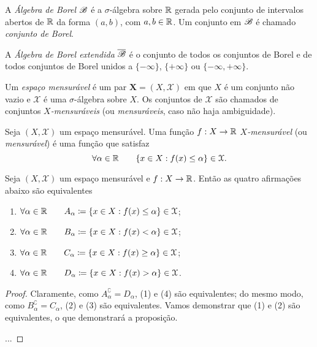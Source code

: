 \begin{defi}
	A \emph{Álgebra de Borel} $\mathscr B$ é a $\sigma$-álgebra sobre $\mathbb{R}$ gerada pelo conjunto de intervalos abertos de $\mathbb{R}$ da forma $(a,b)$, com $a,b \in \mathbb{R}$. Um conjunto em $\mathscr B$ é chamado \emph{conjunto de Borel}.
\end{defi}

\begin{defi}
	A \emph{Álgebra de Borel extendida} $\overline{\mathscr B}$ é o conjunto de todos os conjuntos de Borel e de todos conjuntos de Borel unidos a $\{-\infty\}$, $\{+\infty\}$ ou $\{-\infty,+\infty\}$.
\end{defi}

\begin{defi}
	Um \emph{espaço mensurável} é um par $\bm X = (X,\mathcal X)$ em que $X$ é um conjunto não vazio e $\mathcal X$ é uma $\sigma$-álgebra sobre $X$. Os conjuntos de $\mathcal X$ são chamados de conjuntos \emph{$X$-mensuráveis} (ou \emph{mensuráveis}, caso não haja ambiguidade).
\end{defi}

\begin{defi}
	Seja $(X,\mathcal X)$ um espaço mensurável. Uma função $f: X \to \mathbb{R}$ \emph{$X$-mensurável} (ou \emph{mensurável}) é uma função que satisfaz
	\begin{equation*}
	\forall \alpha \in \mathbb{R} \qquad \{x \in X : f(x) \leq \alpha\} \in \mathcal X.
	\end{equation*}
\end{defi}

\begin{prop}
	Seja $(X,\mathcal X)$ um espaço mensurável e $f: X \to \mathbb{R}$. Então as quatro afirmações abaixo são equivalentes
	\begin{enumerate}
	\item $\forall \alpha \in \mathbb{R} \qquad A_\alpha \coloneqq \{x \in X : f(x) \leq \alpha\} \in \mathcal X$;
	\item $\forall \alpha \in \mathbb{R} \qquad B_\alpha \coloneqq \{x \in X : f(x) < \alpha\} \in \mathcal X$;
	\item $\forall \alpha \in \mathbb{R} \qquad C_\alpha \coloneqq \{x \in X : f(x) \geq \alpha\} \in \mathcal X$;
	\item $\forall \alpha \in \mathbb{R} \qquad D_\alpha \coloneqq \{x \in X : f(x) > \alpha\} \in \mathcal X$.
	\end{enumerate}
\end{prop}
\begin{proof}
	Claramente, como $A_\alpha^\complement = D_\alpha$, (1) e (4) são equivalentes; do mesmo modo, como $B_\alpha^\complement = C_\alpha$, (2) e (3) são equivalentes. Vamos demonstrar que (1) e (2) são equivalentes, o que demonstrará a proposição.
	
	...	
\end{proof}

